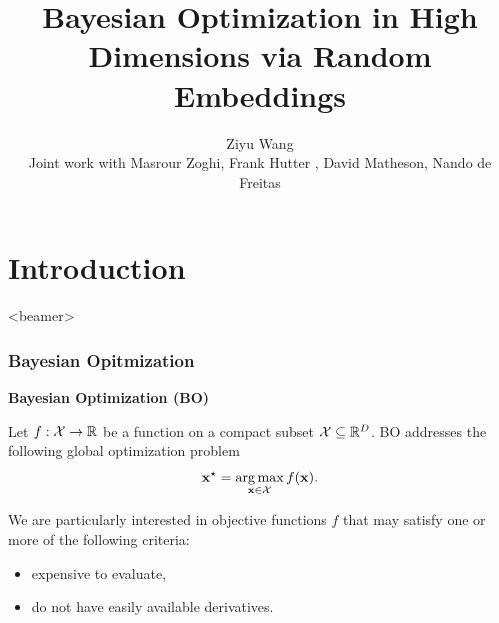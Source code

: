 \documentclass[grey]{beamer}
\title{Bayesian Optimization in High Dimensions via Random Embeddings}
\author[Ziyu Wang]{Ziyu Wang\\ [3mm]Joint work with Masrour Zoghi, Frank Hutter
, David Matheson, Nando de Freitas}
\date{}                    %
\DeclareMathOperator*{\argmax}{arg\,max}
\begin{document}
\begin{frame}
  \titlepage
\end{frame}

\section[Outline]{}

\begin{frame}
  \tableofcontents
\end{frame}


\section{Introduction}
\label{sec:ahmc}
\begin{frame}<beamer>
 \tableofcontents[currentsection]
\end{frame}

\begin{frame}
 \frametitle{Bayesian Opitmization}
 {\bf \textcolor{myColor}{Bayesian Optimization (BO)}}

 Let $f: {\cal X} \to \mathbb{R}$ be a function on a compact subset 
 ${\cal X} \subseteq \mathbb{R}^D$. 
 BO addresses the following global optimization problem
 \[ \vx^{\star} = \argmax_{\vx \in {\cal X}} f(\vx). \]

 We are particularly interested in objective functions $f$ 
 that may satisfy one or more of the following criteria: 
 \begin{itemize}
  \item expensive to evaluate,
  \item do not have easily available derivatives.
 \end{itemize}
\end{frame}
\end{document}
